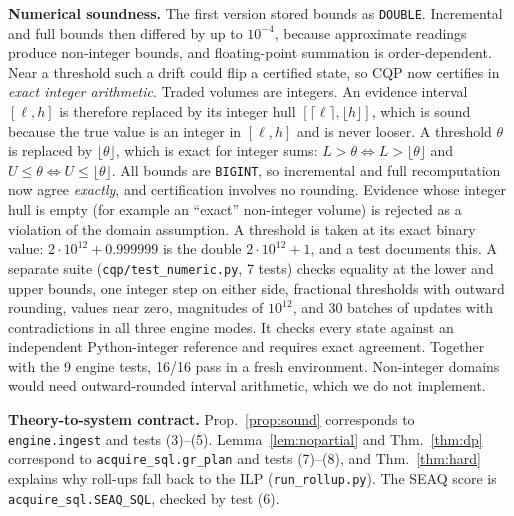 \documentclass[conference]{IEEEtran}
\newcommand{\seaq}{SEAQ\xspace}
\begin{document}
\textbf{Numerical soundness.} The first version stored bounds as \texttt{DOUBLE}. Incremental and full bounds then
differed by up to $10^{-4}$, because approximate readings produce non-integer bounds, and floating-point summation is
order-dependent. Near a threshold such a drift could flip a certified state, so CQP now certifies in \emph{exact integer
arithmetic}. Traded volumes are integers. An evidence interval $[\ell,h]$ is therefore replaced by its integer hull
$[\lceil\ell\rceil,\lfloor h\rfloor]$, which is sound because the true value is an integer in $[\ell,h]$ and is never
looser. A threshold $\theta$ is replaced by $\lfloor\theta\rfloor$, which is exact for integer sums: $L>\theta \iff
L>\lfloor\theta\rfloor$ and $U\le\theta\iff U\le\lfloor\theta\rfloor$. All bounds are \texttt{BIGINT}, so incremental and
full recomputation now agree \emph{exactly}, and certification involves no rounding. Evidence whose integer hull is
empty (for example an ``exact'' non-integer volume) is rejected as a violation of the domain assumption. A threshold is
taken at its exact binary value: $2\cdot10^{12}+0.999999$ is the double $2\cdot10^{12}+1$, and a test documents this.
A separate suite (\texttt{cqp/test\_numeric.py}, 7 tests) checks equality at the lower and upper bounds, one integer
step on either side, fractional thresholds with outward rounding, values near zero, magnitudes of $10^{12}$, and 30
batches of updates with contradictions in all three engine modes. It checks every state against an independent
Python-integer reference and requires exact agreement. Together with the 9 engine tests, 16/16 pass in a fresh
environment. Non-integer domains would need outward-rounded interval arithmetic, which we do not implement.

\textbf{Theory-to-system contract.} Prop.~\ref{prop:sound} corresponds to \texttt{engine.ingest} and tests (3)--(5).
Lemma~\ref{lem:nopartial} and Thm.~\ref{thm:dp} correspond to \texttt{acquire\_sql.gr\_plan} and tests (7)--(8), and
Thm.~\ref{thm:hard} explains why roll-ups fall back to the ILP (\texttt{run\_rollup.py}). The \seaq{} score is
\texttt{acquire\_sql.SEAQ\_SQL}, checked by test (6).
\end{document}

